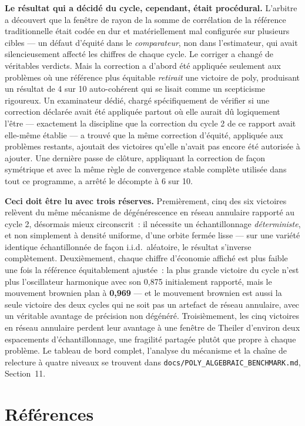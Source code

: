 \documentclass[11pt,a4paper]{article}
\begin{document}
\textbf{Le résultat qui a décidé du cycle, cependant, était procédural.}
L'arbitre a découvert que la fenêtre de rayon de la somme de corrélation
de la référence traditionnelle était codée en dur et matériellement mal
configurée sur plusieurs cibles --- un défaut d'équité dans le
\emph{comparateur}, non dans l'estimateur, qui avait silencieusement
affecté les chiffres de chaque cycle. Le corriger a changé de véritables
verdicts. Mais la correction a d'abord été appliquée seulement aux
problèmes où une référence plus équitable \emph{retirait} une victoire de
poly, produisant un résultat de 4 sur 10 auto-cohérent qui se lisait comme
un scepticisme rigoureux. Un examinateur dédié, chargé spécifiquement de
vérifier si une correction déclarée avait été appliquée partout où elle
aurait dû logiquement l'être --- exactement la discipline que la
correction du cycle 2 de ce rapport avait elle-même établie --- a trouvé
que la même correction d'équité, appliquée aux problèmes restants,
ajoutait des victoires qu'elle n'avait pas encore été autorisée à
ajouter. Une dernière passe de clôture, appliquant la correction de façon
symétrique et avec la même règle de convergence stable complète utilisée
dans tout ce programme, a arrêté le décompte à 6 sur 10.

\textbf{Ceci doit être lu avec trois réserves.} Premièrement, cinq des six
victoires relèvent du même mécanisme de dégénérescence en réseau annulaire
rapporté au cycle 2, désormais mieux circonscrit~: il nécessite un
échantillonnage \emph{déterministe}, et non simplement à densité uniforme,
d'une orbite fermée lisse --- sur une variété identique échantillonnée de
façon i.i.d.\ aléatoire, le résultat s'inverse complètement.
Deuxièmement, chaque chiffre d'économie affiché est plus faible une fois
la référence équitablement ajustée~: la plus grande victoire du cycle
n'est plus l'oscillateur harmonique avec son 0,875 initialement rapporté,
mais le mouvement brownien plan à \textbf{0,969} --- et le mouvement
brownien est aussi la seule victoire des deux cycles qui ne soit pas un
artefact de réseau annulaire, avec un véritable avantage de précision non
dégénéré. Troisièmement, les cinq victoires en réseau annulaire perdent
leur avantage à une fenêtre de Theiler d'environ deux espacements
d'échantillonnage, une fragilité partagée plutôt que propre à chaque
problème. Le tableau de bord complet, l'analyse du mécanisme et la chaîne
de relecture à quatre niveaux se trouvent dans
\texttt{docs/POLY\_ALGEBRAIC\_BENCHMARK.md}, Section~11.

\section*{Références}
\end{document}
